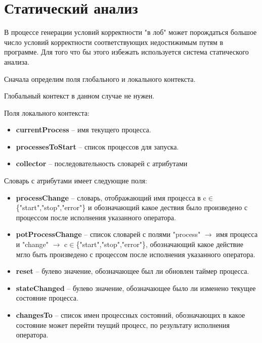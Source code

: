 \chapter{Статический анализ}
В процессе генерации условий корректности "в лоб" может порождаться большое число условий корректности соответствующих недостижимым путям в программе. Для того что бы этого избежать используется система статического анализа.

Сначала определим поля глобального и локального контекста.

Глобальный контекст в данном случае не нужен.

Поля локального контекста:

\begin{itemize}
    \item \textbf{currentProcess} -- имя текущего процесса.
    \item \textbf{processesToStart} -- список процессов для запуска.
    \item \textbf{collector} -- последовательность словарей с атрибутами
\end{itemize}

Словарь с атрибутами имеет следующие поля:
\begin{itemize}
    \item \textbf{processChange} -- словарь, отображающий имя процесса в c$\in$\{"start","stop","error"\} и обозначающий какое дествия было произведено с процессом после исполнения указанного оператора.
    \item \textbf{potProcessChange} -- список словарей с полями "process" $\rightarrow$ имя процесса и "change" $\rightarrow$ c$\in$\{"start","stop","error"\}, обозначающий какое действие мгло быть произведено с процессом после исполнения указанного оператора.
    \item \textbf{reset} -- булево значение, обозначающее был ли обновлен таймер процесса.
    \item \textbf{stateChanged} -- булево значение, обозначающее было ли изменено текущее состояние процесса.
    \item \textbf{changesTo} -- список имен процессных состояний, обозначающих в какое состояние может перейти теущий процесс, по результату исполнения оператора.
\end{itemize}

